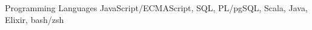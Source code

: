 \cvitem
{
  Programming Languages
}
{
  JavaScript/ECMAScript, SQL, PL/pgSQL, Scala, Java, Elixir, bash/zsh
}
